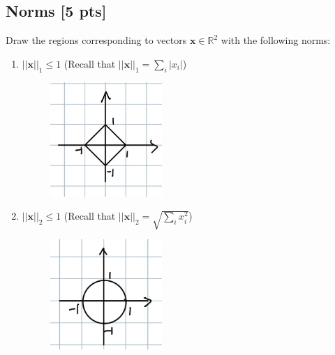 \documentclass[a4paper]{article}
\theoremstyle{definition}
\newcommand{\RR}{\mathbb{R}}
\newenvironment{soln}{
	\leavevmode\color{blue}\ignorespaces
}{}
\begin{document}
	\subsection{Norms [5 pts]}
	Draw the regions corresponding to vectors $\mathbf{x}\in\RR^2$ with the following norms:
	\begin{enumerate}
		\item 	$||\mathbf{x}||_1\leq 1$ (Recall that $||\mathbf{x}||_1 = \sum_i |x_i|$)

		\begin{soln}
	   	\begin{figure}[h!]
	       \centering
	       \includegraphics[width=0.4\textwidth]{Figure1.png}  
	       \captionsetup{labelformat=empty}
	       \caption{}
	    \label{fig:my_label}
	   	\end{figure}
		\end{soln}
		
		\item 	$||\mathbf{x}||_2 \leq 1$ (Recall that $||\mathbf{x}||_2 =\sqrt{\sum_i x_i^2}$) 		
			\begin{soln}
	   		\begin{figure}[h!]
	        	\centering
	    	   	\includegraphics[width=0.4\textwidth]{Figure2.png}  
	    	   	\captionsetup{labelformat=empty}
	    	   	\caption{}
	    	\label{fig:my_label}
	   		\end{figure}
		\end{soln}
		

\end{enumerate}
\end{document}
